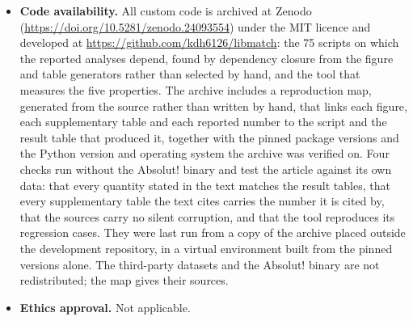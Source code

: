 \documentclass[pdflatex,sn-nature]{sn-jnl}
\theoremstyle{thmstyleone}
\theoremstyle{thmstyletwo}
\theoremstyle{thmstylethree}
\begin{document}
\begin{itemize}
The matched libraries themselves are not redistributed. Their sequences were
designed for this study, but their labels are binding energies computed by
running Absolut!, whose terms govern redistribution of the software but do not
state whether material computed with it may be redistributed. We therefore
claim no right that was not granted to us. The
archive instead carries each library's specification, its per-file SHA-256
digest, and the script that rebuilds it from a reader's own licensed Absolut!
download. The energies are deterministic and the sequence sets are drawn from
fixed seeds, so the digests establish whether a rebuild is identical to the
file we used. The same applies to the quarantined first version of the
1NCA\_N library compared in Supplementary Table~S10.
\item \textbf{Code availability.} All custom code is archived at Zenodo \cite{libmatch2026}
(\url{https://doi.org/10.5281/zenodo.24093554}) under the MIT licence and
developed at \url{https://github.com/kdh6126/libmatch}: the 75 scripts on
which the reported analyses depend, found by dependency closure from the
figure and table generators rather than selected by hand, and the tool that
measures the five properties. The archive includes a reproduction map,
generated from the source rather than written by hand, that links each figure,
each supplementary table and each reported number to the script and the result
table that produced it, together with the pinned package versions and the
Python version and operating system the archive was verified on. Four checks
run without the Absolut! binary and test the article against its own data:
that every quantity stated in the text matches the result tables, that every
supplementary table the text cites carries the number it is cited by, that the
sources carry no silent corruption, and that the tool reproduces its
regression cases. They were last run from a copy of the archive placed outside
the development repository, in a virtual environment built from the pinned
versions alone. The third-party datasets and the Absolut! binary are not
redistributed; the map gives their sources.
\item \textbf{Ethics approval.} Not applicable.
\end{itemize}
\end{document}
